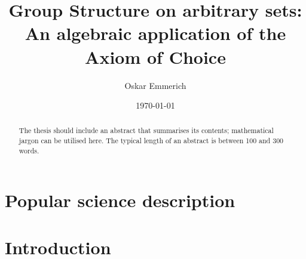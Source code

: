 \documentclass[a4paper,12pt]{memoir}
\numberwithin{equation}{section} %
\theoremstyle{plain} %
\theoremstyle{definition} %
\theoremstyle{remark} %
\begin{document}

\author{Oskar Emmerich}

\title{Group Structure on arbitrary sets:\\An algebraic application of the Axiom of Choice}

\date{\today}



\frontmatter %


\thispagestyle{empty}

\begin{abstract}
  The thesis should include an abstract that summarises its contents;
  mathematical jargon can be utilised here. The typical length of an abstract is
  between 100 and 300 words.
\end{abstract}



\chapter*{Popular science description}




\cleardoublepage

\tableofcontents*



\chapter*{Introduction}




\mainmatter %
\end{document}
